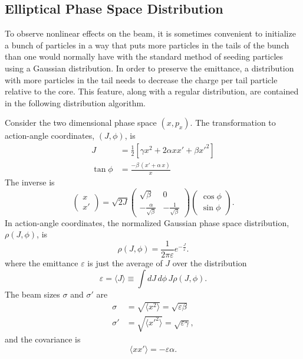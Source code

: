 \subsection{Elliptical Phase Space Distribution}
\label{s:ellipse.init}

To observe nonlinear effects on the beam, it is sometimes convenient to initialize a bunch of
particles in a way that puts more particles in the tails of the bunch than one would normally have
with the standard method of seeding particles using a Gaussian distribution. In order to preserve
the emittance, a distribution with more particles in the tail needs to decrease the charge per tail
particle relative to the core.  This feature, along with a regular distribution, are contained in
the following  distribution algorithm.

Consider the two dimensional phase space $(x, p_x)$. 
The transformation to action-angle coordinates,
$(J, \phi)$, is
\begin{align}
  J &= \frac{1}{2}[\gamma x^2 + 2 \alpha x x' + \beta x'^2] \\
  \tan\phi &= \frac{-\beta \, (x' + \alpha \, x)}{x}
\end{align}
The inverse is
\begin{equation}
  \begin{pmatrix} 
    x \\ x' 
  \end{pmatrix} 
  = \sqrt{2J} 
  \begin{pmatrix} 
    \sqrt{\beta} & 0 \\ -\frac{\alpha}{\sqrt{\beta}} & 
    -\frac{1}{\sqrt{\beta}} 
  \end{pmatrix}
  \begin{pmatrix} 
    \cos\phi \\ 
    \sin\phi 
  \end{pmatrix}.
\end{equation}
In action-angle coordinates, the normalized Gaussian phase space 
distribution, $\rho(J, \phi)$, is
\begin{equation}
  \rho(J,\phi) = \frac{1}{2\pi\varepsilon} e^{-\frac{J}{\varepsilon}}.
  \label{eq:rho}
\end{equation}
where the emittance $\varepsilon$ is just the average of $J$ over the distribution
\begin{equation}
  \varepsilon = \langle J \rangle \equiv \int dJ \, d\phi \, J\rho(J,\phi).
  \label{eq:eps}
\end{equation}
The beam sizes $\sigma$ and $\sigma'$ are
\begin{align}
  \sigma  & = \sqrt{\langle x^2 \rangle} = \sqrt{\varepsilon\beta}  \\
  \sigma' & = \sqrt{\langle x'^2 \rangle} = \sqrt{\varepsilon\gamma},
  \label{eq:rms}
\end{align}
and the covariance is
\begin{equation}
  \langle xx' \rangle = -\varepsilon\alpha.
  \label{eq:corr}
\end{equation}

